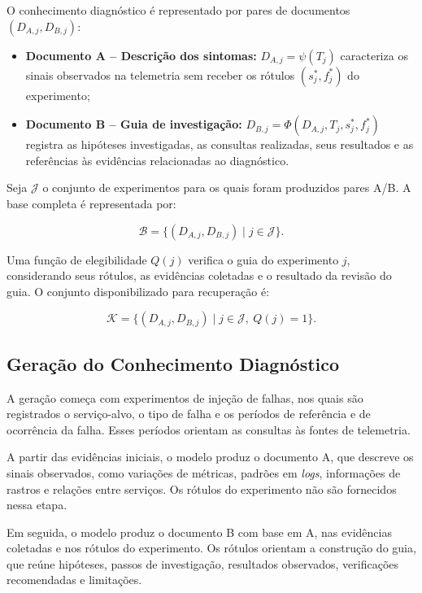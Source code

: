 \documentclass[12pt]{article}
\begin{document}
O conhecimento diagnóstico é representado por pares de documentos
$(D_{A,j},D_{B,j})$:

\begin{itemize}
  \item \textbf{Documento A -- Descrição dos sintomas:}
  $D_{A,j}=\psi(T_j)$ caracteriza os sinais observados na telemetria sem
  receber os rótulos $(s_j^*,f_j^*)$ do experimento;

  \item \textbf{Documento B -- Guia de investigação:}
  $D_{B,j}=\Phi(D_{A,j},T_j,s_j^*,f_j^*)$ registra as hipóteses investigadas,
  as consultas realizadas, seus resultados e as referências às evidências
  relacionadas ao diagnóstico.
\end{itemize}

Seja $\mathcal{J}$ o conjunto de experimentos para os quais foram produzidos
pares A/B. A base completa é representada por:

\begin{equation}
  \mathcal{B} =
  \{(D_{A,j},D_{B,j}) \mid j\in\mathcal{J}\}.
\end{equation}

Uma função de elegibilidade $Q(j)$ verifica o guia do experimento $j$,
considerando seus rótulos, as evidências coletadas e o resultado da revisão
do guia. O conjunto disponibilizado para recuperação é:

\begin{equation}
  \mathcal{K} =
  \{(D_{A,j},D_{B,j}) \mid j\in\mathcal{J},\ Q(j)=1\}.
\end{equation}

\subsection{Geração do Conhecimento Diagnóstico}

A geração começa com experimentos de injeção de falhas, nos quais são
registrados o serviço-alvo, o tipo de falha e os períodos de referência e de
ocorrência da falha. Esses períodos orientam as consultas às fontes de
telemetria.

A partir das evidências iniciais, o modelo produz o documento A, que descreve
os sinais observados, como variações de métricas, padrões em \textit{logs},
informações de rastros e relações entre serviços. Os rótulos do experimento
não são fornecidos nessa etapa.

Em seguida, o modelo produz o documento B com base em A, nas evidências
coletadas e nos rótulos do experimento. Os rótulos orientam a construção do
guia, que reúne hipóteses, passos de investigação, resultados observados,
verificações recomendadas e limitações.
\end{document}
